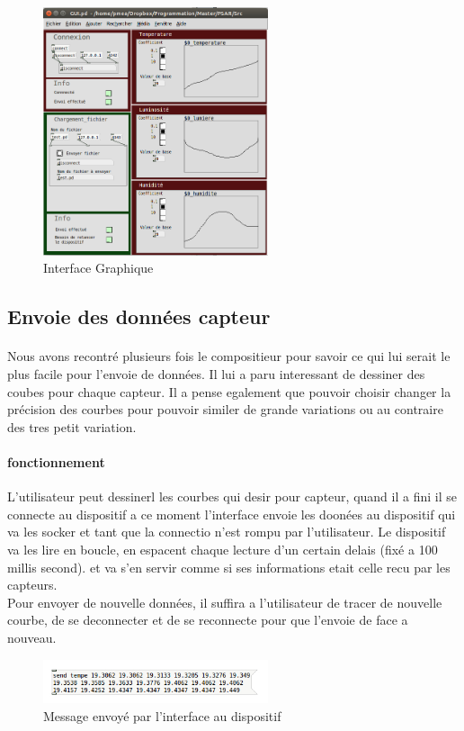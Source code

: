 \documentclass[a4paper, titlepage, oneside, 12pt]{article}%
\begin{document}
\begin{figure}[H]
	\centering
	\includegraphics[width=250px] {GUI.jpg}
	\caption{Interface Graphique}
\end{figure}
\subsection{Envoie des données capteur}
\paragraph{}
Nous avons recontré plusieurs fois le compositieur pour savoir ce qui lui serait le plus facile pour l'envoie de données. Il lui a paru interessant de dessiner des coubes pour chaque capteur. Il a pense egalement que pouvoir choisir changer la précision des courbes pour pouvoir similer de grande variations ou au contraire des tres petit variation.\\

\paragraph{fonctionnement}
L'utilisateur peut dessinerl les courbes qui desir pour capteur, quand il a fini il se connecte au dispositif a ce moment l'interface envoie les doonées au dispositif qui va les socker et tant que la connectio n'est rompu par l'utilisateur. Le dispositif va les lire en boucle, en espacent chaque lecture d'un certain delais (fixé a 100 millis second). et va s'en servir comme si ses informations etait celle recu par les capteurs.\\
Pour envoyer de nouvelle données, il suffira a l'utilisateur de tracer de nouvelle courbe, de se deconnecter et de se reconnecte pour que l'envoie de face a nouveau.

\begin{figure}[H]
	\centering
	\includegraphics[width=250px] {senddata.jpg}
	\caption{Message envoyé par l'interface au dispositif}
\end{figure}
\end{document}
